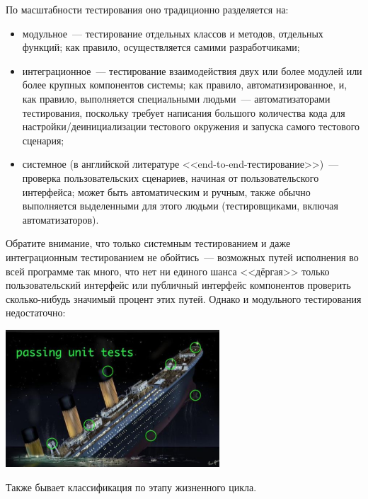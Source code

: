 \documentclass{../../text-style}
\begin{document}
По масштабности тестирования оно традиционно разделяется на:

\begin{itemize}
    \item модульное~--- тестирование отдельных классов и методов, отдельных функций; как правило, осуществляется самими разработчиками;
    \item интеграционное~--- тестирование взаимодействия двух или более модулей или более крупных компонентов системы; как правило, автоматизированное, и, как правило, выполняется специальными людьми~--- автоматизаторами тестирования, поскольку требует написания большого количества кода для настройки/деинициализации тестового окружения и запуска самого тестового сценария;
    \item системное (в английской литературе <<end-to-end-тестирование>>)~--- проверка пользовательских сценариев, начиная от пользовательского интерфейса; может быть автоматическим и ручным, также обычно выполняется выделенными для этого людьми (тестировщиками, включая автоматизаторов).
\end{itemize}

Обратите внимание, что только системным тестированием и даже интеграционным тестированием не обойтись~--- возможных путей исполнения во всей программе так много, что нет ни единого шанса <<дёргая>> только пользовательский интерфейс или публичный интерфейс компонентов проверить сколько-нибудь значимый процент этих путей. Однако и модульного тестирования недостаточно:

\begin{center}
    \includegraphics[width=0.6\textwidth]{titanic.png}
\end{center}

Также бывает классификация по этапу жизненного цикла.
\end{document}

